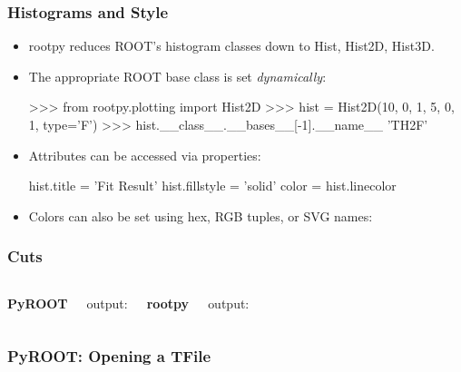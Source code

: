 \documentclass[10pt,professionalfonts,serif,usenames,dvipsnames,svgnames,table]{beamer}
\begin{document}
\begin{frame}[fragile]
    \frametitle{Histograms and Style}
    \begin{itemize}
        \item rootpy reduces ROOT's histogram classes down to Hist, Hist2D,
            Hist3D.
        \item The appropriate ROOT base class is set {\em dynamically}:
\begin{pyglist}[language=python,style=vs]
>>> from rootpy.plotting import Hist2D
>>> hist = Hist2D(10, 0, 1, 5, 0, 1, type='F')
>>> hist.__class__.__bases__[-1].__name__
'TH2F'
\end{pyglist}
\item Attributes can be accessed via properties:
\begin{pyglist}[language=python,texcl=true,style=vs]
hist.title = 'Fit Result'
hist.fillstyle = 'solid'
color = hist.linecolor
\end{pyglist}
\item Colors can also be set using hex, RGB tuples, or SVG names:
\end{itemize}
\end{frame}

\begin{frame}[fragile]
    \frametitle{Cuts}
    \begin{columns}
        {\bf PyROOT}
        
        \vspace{-.3cm}
        output:
        \vspace{-.3cm}
        
        {\bf rootpy}
        
        \vspace{-.3cm}
        output:
        \vspace{-.3cm}
        
    \end{columns}
\end{frame}

\begin{frame}[fragile]
    \frametitle{PyROOT: Opening a TFile}

    
    \vspace{-.5cm}
    
\end{frame}
\end{document}
